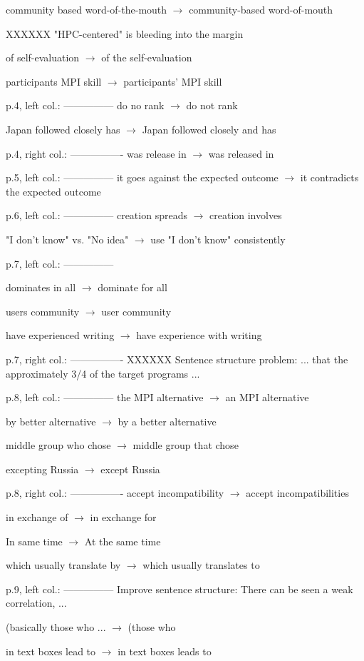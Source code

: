 \documentclass[11pt]{article}
\begin{document}
{community based word-of-the-mouth $\to$ community-based word-of-mouth

XXXXXX "HPC-centered" is bleeding into the margin

of self-evaluation $\to$ of the self-evaluation

participants MPI skill $\to$ participants' MPI skill

p.4, left col.:
---------------
do no rank $\to$ do not rank

Japan followed closely has $\to$ Japan followed closely and has

p.4, right col.:
----------------
was release in $\to$ was released in

p.5, left col.:
---------------
it goes against the expected outcome $\to$
it contradicts the expected outcome

p.6, left col.:
---------------
creation spreads $\to$ creation involves

"I don't know" vs. "No idea" $\to$ use "I don't know" consistently

p.7, left col.:
---------------

dominates in all $\to$ dominate for all

users community $\to$ user community

have experienced writing $\to$ have experience with writing

p.7, right col.:
----------------
XXXXXX Sentence structure problem:
... that the approximately 3/4 of the target programs ...

p.8, left col.:
---------------
the MPI alternative $\to$ an MPI alternative

by better alternative $\to$ by a better alternative

middle group who chose $\to$ middle group that chose

excepting Russia $\to$ except Russia

p.8, right col.:
----------------
accept incompatibility $\to$ accept incompatibilities

in exchange of $\to$ in exchange for

In same time $\to$ At the same time

which usually translate by $\to$ which usually translates to

p.9, left col.:
---------------
Improve sentence structure:
There can be seen a weak correlation, ...

(basically those who ... $\to$ (those who

in text boxes lead to $\to$ in text boxes leads to

}
\end{document}
